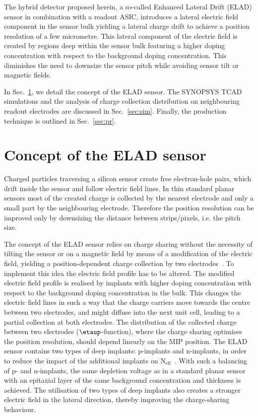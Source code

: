 \documentclass[a4paper,11pt]{article}
\begin{document}
The hybrid detector proposed herein, a so-called Enhanced Lateral Drift (ELAD) sensor in combination with a readout ASIC,
 introduces a lateral electric field component in the sensor bulk yielding a lateral charge drift to achieve a position resolution of a few micrometre. 
This lateral component of the electric field is created by regions deep within the sensor bulk featuring a higher doping concentration with respect to the background doping concentration.
This diminishes the need to downsize the sensor pitch while avoiding sensor tilt or magnetic fields. 

In Sec.~\ref{sec:con}, we detail the concept of the ELAD sensor.
The SYNOPSYS TCAD simulations and the analysis of charge collection distribution on neighbouring readout electrodes are discussed in Sec.~\ref{sec:sim}.
Finally, the production technique is outlined in Sec.~\ref{sec:pr}. 


\section{Concept of the ELAD sensor}
\label{sec:con}
Charged particles traversing a silicon sensor create free electron-hole pairs, which drift inside the sensor and follow electric field lines.
In thin standard planar sensors most of the created charge is collected by the nearest electrode and only a small part by the neighbouring electrode.
Therefore the position resolution can be improved only by downsizing the distance between strips/pixels, i.e. the pitch size.

The concept of the ELAD sensor relies on charge sharing without the necessity of tilting the sensor or on a magnetic field by means of a modification of the electric field,
 yielding a position-dependent charge collection by two electrodes~\cite{hj}.
To implement this idea the electric field profile has to be altered.
The modified electric field profile is realised by implants with higher doping concentration with respect to the background doping concentration in the bulk. 
This changes the electric field lines in such a way that the charge carriers move towards the centre between two electrodes, and might diffuse into the next unit cell, leading to a partial collection at both electrodes.
The distribution of the collected charge between two electrodes ($\etaup$-function), where the charge sharing optimises the position resolution, should depend linearly on the MIP position.
The ELAD sensor contains two types of deep implants: p-implants and n-implants, in order to reduce the impact of the additional implants on $\mathrm{N_{eff}}$~\cite{elad}. 
With such a balancing of p- and n-implants, the same depletion voltage as in a standard planar sensor with an epitaxial layer of the same background concentration and thickness is achieved.
The utilisation of two types of deep implants also creates a stronger electric field in the lateral direction, thereby improving the charge-sharing behaviour.
\end{document}
